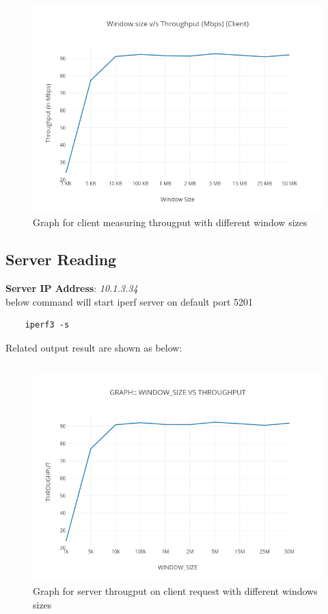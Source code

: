 \documentclass[paper=letter, fontsize=12pt]{article}
\begin{document}
\begin{figure}[H]
	\centering
	\includegraphics[scale=0.5]{../client.png}
	\caption{Graph for client measuring througput with different window sizes}
\end{figure}


\subsection*{Server Reading}
\textbf{Server IP Address}: \textit{10.1.3.34}
\\ below command will start iperf server on default port 5201
\begin{verbatim}
	iperf3 -s
\end{verbatim}


Related output result are shown as below:
\inputminted[frame=lines, breaklines, linenos]{c}{../server_10.1.3.34_data.csv}

\begin{figure}[H]
	\centering
	\includegraphics[scale=0.5]{../server.png}
	\caption{Graph for server througput on client request with different windows sizes}
\end{figure}
\end{document}
